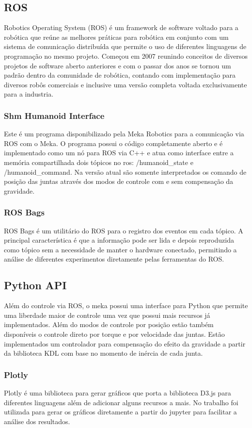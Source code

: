 \subsection{ROS}

Robotics Operating System (ROS) é um framework de software voltado para a robótica que reúne as melhores práticas para robótica em conjunto com um sistema de comunicação distribuída que permite o uso de diferentes linguagens de programação no mesmo projeto. Começou em 2007 reunindo conceitos de diversos projetos de software aberto anteriores e com o passar dos anos se tornou um padrão dentro da comunidade de robótica, contando com implementação para diversos robôs comerciais e inclusive uma versão completa voltada exclusivamente para a industria.

\subsubsection{Shm Humanoid Interface}

Este é um programa disponibilizado pela Meka Robotics para a comunicação via ROS com o Meka. O programa possui o código completamente aberto e é implementado como um nó para ROS via C++ e atua como interface entre a memória compartilhada dois tópicos no ros: /humanoid\_state e /humanoid\_command. Na versão atual são somente interpretados os comando de posição das juntas através dos modos de controle com e sem compensação da gravidade.

\subsubsection{ROS Bags}

ROS Bags é um utilitário do ROS para o registro dos eventos em cada tópico. A principal característica é que a informação pode ser lida e depois reproduzida como tópico sem a necessidade de manter o hardware conectado, permitindo a análise de diferentes experimentos diretamente pelas ferramentas do ROS.

\subsection{Python API}

Além do controle via ROS, o meka possui uma interface para Python que permite uma liberdade maior de controle uma vez que possui mais recursos já implementados. Além do modos de controle por posição estão também disponíveis o controle direto por torque e por velocidade das juntas. Estão implementados um controlador para compensação do efeito da gravidade a partir da biblioteca KDL com base no momento de inércia de cada junta.

\subsubsection{Plotly}

Plotly é uma biblioteca para gerar gráficos que porta a biblioteca D3.js para diferentes linguagens além de adicionar alguns recursos a mais. No trabalho foi utilizada para gerar os gráficos diretamente a partir do jupyter para facilitar a análise dos resultados.